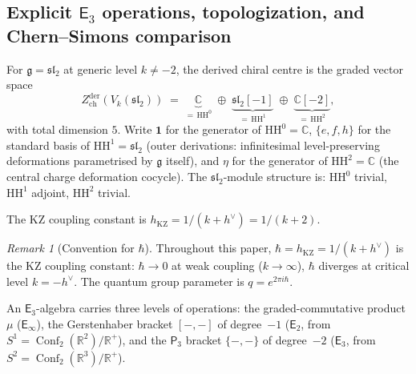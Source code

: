 \documentclass[11pt,reqno]{amsart}
\theoremstyle{definition}
\theoremstyle{remark}
\newtheorem{remark}[theorem]{Remark}
\newcommand{\HH}{\mathrm{HH}}
\newcommand{\Etwo}{\mathsf{E}_{2}}
\providecommand{\Ethree}{\mathsf{E}_{3}}
\newcommand{\Einf}{\mathsf{E}_{\infty}}
\newcommand{\Pthree}{\mathsf{P}_{3}}
\DeclareMathOperator{\Conf}{Conf}
\newcommand{\fg}{\mathfrak{g}}
\newcommand{\CC}{\mathbb{C}}
\newcommand{\RR}{\mathbb{R}}
\numberwithin{equation}{section}
\begin{document}
\subsection{Explicit $\Ethree$ operations, topologization,
and Chern--Simons comparison}
\label{subsec:e3-explicit}

For $\fg = \mathfrak{sl}_2$ at generic level $k \neq -2$,
the derived chiral centre is the graded vector space
\begin{equation}\label{eq:e3-graded-space}
  Z^{\mathrm{der}}_{\mathrm{ch}}(V_k(\mathfrak{sl}_2))
  \;=\;
  \underbrace{\CC}_{=\, \HH^0}
  \;\oplus\;
  \underbrace{\mathfrak{sl}_2[-1]}_{=\, \HH^1}
  \;\oplus\;
  \underbrace{\CC[-2]}_{=\, \HH^2},
\end{equation}
with total dimension $5$. Write $\mathbf{1}$
for the generator of $\HH^0 = \CC$,
$\{e, f, h\}$ for the standard basis of
$\HH^1 = \mathfrak{sl}_2$
(outer derivations: infinitesimal level-preserving
deformations parametrised by $\fg$ itself), and $\eta$
for the generator of $\HH^2 = \CC$
(the central charge deformation cocycle). The
$\mathfrak{sl}_2$-module structure is: $\HH^0$ trivial,
$\HH^1$ adjoint, $\HH^2$ trivial.

The KZ coupling constant is
$h_{\mathrm{KZ}} = 1/(k + h^\vee) = 1/(k + 2)$.

\begin{remark}[Convention for $\hbar$]
\label{rem:hbar-convention}
Throughout this paper, $\hbar = h_{\mathrm{KZ}} = 1/(k + h^\vee)$
is the KZ coupling constant: $\hbar \to 0$ at weak coupling
($k \to \infty$), $\hbar$ diverges at critical level
$k = -h^\vee$. The quantum group parameter is
$q = e^{2\pi i \hbar}$.
\end{remark}

An $\Ethree$-algebra carries three levels of
operations: the graded-commutative product $\mu$ ($\Einf$),
the Gerstenhaber bracket $[-,-]$ of degree~$-1$
($\Etwo$, from $S^1 = \Conf_2(\RR^2)/\RR^+$), and the
$\Pthree$ bracket $\{-,-\}$ of degree~$-2$
($\Ethree$, from $S^2 = \Conf_2(\RR^3)/\RR^+$).
\end{document}
